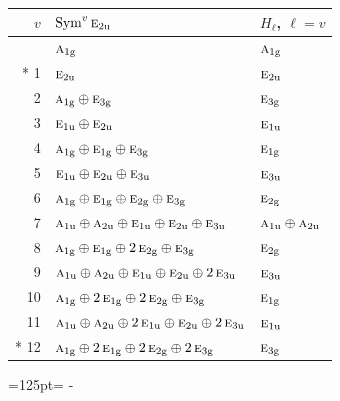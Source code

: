 \documentclass[10pt,a4paper]{article}
\newcommand{\needspace}[1]{\par\penalty-100\begingroup\dimen0=#1\relax\dimen2=\pagegoal
  \advance\dimen2-\pagetotal\ifdim\dimen0>\dimen2\relax\ifdim\dimen2>0pt\vfil\break\fi\fi
  \endgroup}
\numberwithin{equation}{section}
\newcommand{\irr}[1]{\text{\normalfont\scshape #1}}
\newcommand{\ptag}[1]{\mathrm{#1}}
\begin{document}
{\small\begin{longtable}{@{}rll@{}}\toprule
$v$ & $\operatorname{Sym}^{v}\irr{e}_{2\ptag{u}}$ & $H_\ell$, $\ell = v$\\\midrule\endhead
\bottomrule\endfoot\endlastfoot
0 & $\irr{a}_{1\ptag{g}}$ & $\irr{a}_{1\ptag{g}}$\\*
1 & $\irr{e}_{2\ptag{u}}$ & $\irr{e}_{2\ptag{u}}$\\
2 & $\irr{a}_{1\ptag{g}} \oplus \irr{e}_{3\ptag{g}}$ & $\irr{e}_{3\ptag{g}}$\\
3 & $\irr{e}_{1\ptag{u}} \oplus \irr{e}_{2\ptag{u}}$ & $\irr{e}_{1\ptag{u}}$\\
4 & $\irr{a}_{1\ptag{g}} \oplus \irr{e}_{1\ptag{g}} \oplus \irr{e}_{3\ptag{g}}$ & $\irr{e}_{1\ptag{g}}$\\
5 & $\irr{e}_{1\ptag{u}} \oplus \irr{e}_{2\ptag{u}} \oplus \irr{e}_{3\ptag{u}}$ & $\irr{e}_{3\ptag{u}}$\\
6 & $\irr{a}_{1\ptag{g}} \oplus \irr{e}_{1\ptag{g}} \oplus \irr{e}_{2\ptag{g}} \oplus \irr{e}_{3\ptag{g}}$ & $\irr{e}_{2\ptag{g}}$\\
7 & $\irr{a}_{1\ptag{u}} \oplus \irr{a}_{2\ptag{u}} \oplus \irr{e}_{1\ptag{u}} \oplus \irr{e}_{2\ptag{u}} \oplus \irr{e}_{3\ptag{u}}$ & $\irr{a}_{1\ptag{u}} \oplus \irr{a}_{2\ptag{u}}$\\
8 & $\irr{a}_{1\ptag{g}} \oplus \irr{e}_{1\ptag{g}} \oplus 2\,\irr{e}_{2\ptag{g}} \oplus \irr{e}_{3\ptag{g}}$ & $\irr{e}_{2\ptag{g}}$\\
9 & $\irr{a}_{1\ptag{u}} \oplus \irr{a}_{2\ptag{u}} \oplus \irr{e}_{1\ptag{u}} \oplus \irr{e}_{2\ptag{u}} \oplus 2\,\irr{e}_{3\ptag{u}}$ & $\irr{e}_{3\ptag{u}}$\\
10 & $\irr{a}_{1\ptag{g}} \oplus 2\,\irr{e}_{1\ptag{g}} \oplus 2\,\irr{e}_{2\ptag{g}} \oplus \irr{e}_{3\ptag{g}}$ & $\irr{e}_{1\ptag{g}}$\\
11 & $\irr{a}_{1\ptag{u}} \oplus \irr{a}_{2\ptag{u}} \oplus 2\,\irr{e}_{1\ptag{u}} \oplus \irr{e}_{2\ptag{u}} \oplus 2\,\irr{e}_{3\ptag{u}}$ & $\irr{e}_{1\ptag{u}}$\\*
12 & $\irr{a}_{1\ptag{g}} \oplus 2\,\irr{e}_{1\ptag{g}} \oplus 2\,\irr{e}_{2\ptag{g}} \oplus 2\,\irr{e}_{3\ptag{g}}$ & $\irr{e}_{3\ptag{g}}$\\
\bottomrule\end{longtable}}
\needspace{125pt}
\end{document}
